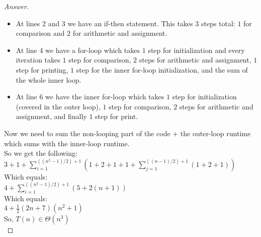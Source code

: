 \documentclass[11pt]{article}
\theoremstyle{definition}
\theoremstyle{definition}
\theoremstyle{definition}
\begin{document}
\begin{proof}[Answer]

\begin{itemize}[]
	\item At lines 2 and 3 we have an if-then statement. This takes $3$ steps total: $1$ for comparison and $2$ for arithmetic and assignment.
	
	\item At line 4 we have a for-loop which takes $1$ step for initialization and every iteration takes $1$ step for comparison, $2$ steps for arithmetic and assignment, $1$ step for printing, $1$ step for the inner for-loop initialization, and the sum of the whole inner loop.
	
	\item At line 6 we have the inner for-loop which takes $1$ step for initialization (covered in the outer loop), $1$ step for comparison, $2$ steps for arithmetic and assignment, and finally $1$ step for print.\\
\end{itemize}

Now we need to sum the non-looping part of the code + the outer-loop runtime which sums with the inner-loop runtime.\\

\noindent So we get the following:\\
$3 + 1 + \displaystyle\sum_{i=1} ^{((n^{2} - 1)/2) + 1} (1 + 2 + 1 + 1 + \displaystyle\sum_{j=1} ^{((n - 1)/2) + 1} (1 + 2 + 1))$\\

\noindent Which equals:\\
$4 + \displaystyle\sum_{i=1} ^{((n^{2} - 1)/2) + 1} (5 + 2(n + 1))$\\

\noindent Which equals:\\
$4 + \frac{1}{2}(2n + 7)(n^2 + 1)$\\

So, $T(n) \in \Theta(n^3)$\\

\end{proof}

\end{document}
